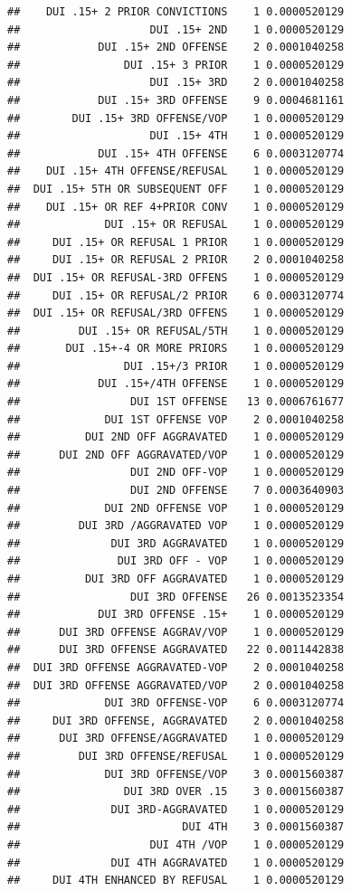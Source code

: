\documentclass[]{book}
\begin{document}
\begin{verbatim}
##    DUI .15+ 2 PRIOR CONVICTIONS    1 0.0000520129
##                    DUI .15+ 2ND    1 0.0000520129
##            DUI .15+ 2ND OFFENSE    2 0.0001040258
##                DUI .15+ 3 PRIOR    1 0.0000520129
##                    DUI .15+ 3RD    2 0.0001040258
##            DUI .15+ 3RD OFFENSE    9 0.0004681161
##        DUI .15+ 3RD OFFENSE/VOP    1 0.0000520129
##                    DUI .15+ 4TH    1 0.0000520129
##            DUI .15+ 4TH OFFENSE    6 0.0003120774
##    DUI .15+ 4TH OFFENSE/REFUSAL    1 0.0000520129
##  DUI .15+ 5TH OR SUBSEQUENT OFF    1 0.0000520129
##    DUI .15+ OR REF 4+PRIOR CONV    1 0.0000520129
##             DUI .15+ OR REFUSAL    1 0.0000520129
##     DUI .15+ OR REFUSAL 1 PRIOR    1 0.0000520129
##     DUI .15+ OR REFUSAL 2 PRIOR    2 0.0001040258
##  DUI .15+ OR REFUSAL-3RD OFFENS    1 0.0000520129
##     DUI .15+ OR REFUSAL/2 PRIOR    6 0.0003120774
##  DUI .15+ OR REFUSAL/3RD OFFENS    1 0.0000520129
##         DUI .15+ OR REFUSAL/5TH    1 0.0000520129
##       DUI .15+-4 OR MORE PRIORS    1 0.0000520129
##                DUI .15+/3 PRIOR    1 0.0000520129
##            DUI .15+/4TH OFFENSE    1 0.0000520129
##                 DUI 1ST OFFENSE   13 0.0006761677
##             DUI 1ST OFFENSE VOP    2 0.0001040258
##          DUI 2ND OFF AGGRAVATED    1 0.0000520129
##      DUI 2ND OFF AGGRAVATED/VOP    1 0.0000520129
##                 DUI 2ND OFF-VOP    1 0.0000520129
##                 DUI 2ND OFFENSE    7 0.0003640903
##             DUI 2ND OFFENSE VOP    1 0.0000520129
##         DUI 3RD /AGGRAVATED VOP    1 0.0000520129
##              DUI 3RD AGGRAVATED    1 0.0000520129
##               DUI 3RD OFF - VOP    1 0.0000520129
##          DUI 3RD OFF AGGRAVATED    1 0.0000520129
##                 DUI 3RD OFFENSE   26 0.0013523354
##            DUI 3RD OFFENSE .15+    1 0.0000520129
##      DUI 3RD OFFENSE AGGRAV/VOP    1 0.0000520129
##      DUI 3RD OFFENSE AGGRAVATED   22 0.0011442838
##  DUI 3RD OFFENSE AGGRAVATED-VOP    2 0.0001040258
##  DUI 3RD OFFENSE AGGRAVATED/VOP    2 0.0001040258
##             DUI 3RD OFFENSE-VOP    6 0.0003120774
##     DUI 3RD OFFENSE, AGGRAVATED    2 0.0001040258
##      DUI 3RD OFFENSE/AGGRAVATED    1 0.0000520129
##         DUI 3RD OFFENSE/REFUSAL    1 0.0000520129
##             DUI 3RD OFFENSE/VOP    3 0.0001560387
##                DUI 3RD OVER .15    3 0.0001560387
##              DUI 3RD-AGGRAVATED    1 0.0000520129
##                         DUI 4TH    3 0.0001560387
##                    DUI 4TH /VOP    1 0.0000520129
##              DUI 4TH AGGRAVATED    1 0.0000520129
##     DUI 4TH ENHANCED BY REFUSAL    1 0.0000520129

\end{verbatim}
\end{document}
